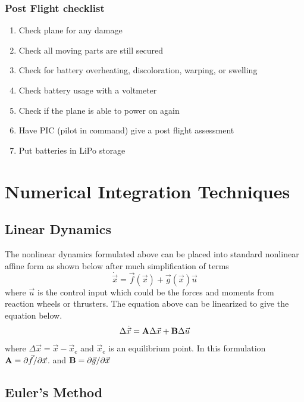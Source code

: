 \documentclass{article}
\begin{document}
\subsubsection{Post Flight checklist}
\begin{enumerate}[itemsep=-5pt]
  \item Check plane for any damage
  \item Check all moving parts are still secured
  \item Check for battery overheating, discoloration, warping, or swelling
  \item Check battery usage with a voltmeter
  \item Check if the plane is able to power on again
  \item Have PIC (pilot in command) give a post flight assessment
  \item Put batteries in LiPo storage
\end{enumerate}

\section{Numerical Integration Techniques}

\subsection{Linear Dynamics}

The nonlinear dynamics formulated above can be placed into standard
nonlinear affine form as shown below after much simplification of
terms
\begin{equation}
  \dot{\vec{x}} = \vec{f}(\vec{x}) + \vec{g}(\vec{x})\vec{u}
\end{equation}
where $\vec{u}$ is the control input which could be the forces and
moments from reaction wheels or thrusters. The equation above can be
linearized to give the equation below. 
\begin{equation}
  \Delta \dot{\vec{x}} = {\bf A}\Delta {\vec{x}} + {\bf B}\Delta \vec{u}
\end{equation}
where $\Delta \vec{x} = \vec{x} - \vec{x}_e$ and $\vec{x}_e$ is an
equilibrium point. In this formulation ${\bf A} = \partial \vec{f}/\partial \vec{x}$. and 
${\bf B} = \partial \vec{g}/\partial \vec{x}$

\subsection{Euler's Method}
\end{document}
